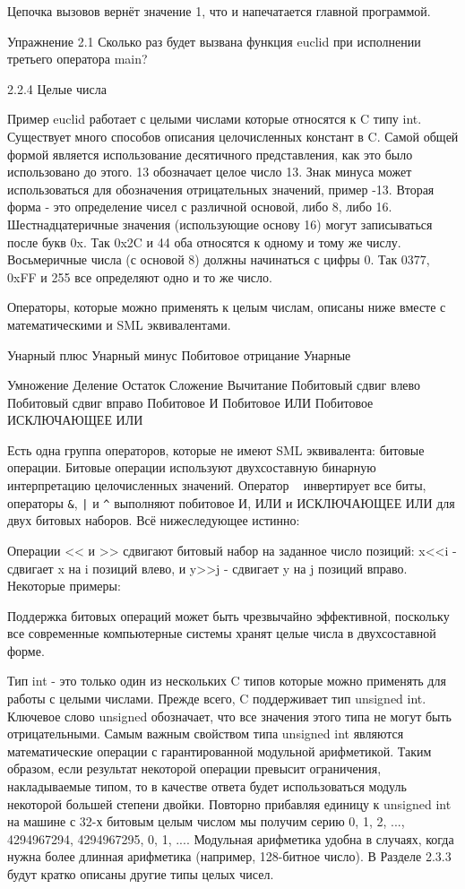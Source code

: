 Цепочка вызовов вернёт значение 1, что и напечатается главной программой.

Упражнение 2.1 Сколько раз будет вызвана функция euclid при исполнении третьего оператора main?

2.2.4 Целые числа

Пример euclid работает с целыми числами которые относятся к C типу int. Существует много способов описания целочисленных констант в C. Самой общей формой является использование десятичного представления, как это было использовано до этого. 13 обозначает целое число 13. Знак минуса может использоваться для обозначения отрицательных значений, пример -13. Вторая форма - это определение чисел с различной основой, либо 8, либо 16. Шестнадцатеричные значения (использующие основу 16) могут записываться после букв 0x. Так 0x2C и 44 оба относятся к одному и тому же числу. Восьмеричные числа (с основой 8) должны начинаться с цифры 0. Так 0377, 0xFF и 255 все определяют одно и то же число.

Операторы, которые можно применять к целым числам, описаны ниже вместе с математическими и SML эквивалентами.

Унарный плюс
Унарный минус
Побитовое отрицание
Унарные

Умножение
Деление
Остаток
Сложение
Вычитание
Побитовый сдвиг влево
Побитовый сдвиг вправо
Побитовое И
Побитовое ИЛИ
Побитовое ИСКЛЮЧАЮЩЕЕ ИЛИ

Есть одна группа операторов, которые не имеют SML эквивалента: битовые операции. Битовые операции используют двухсоставную бинарную интерпретацию целочисленных значений. Оператор ~ инвертирует все биты, операторы \lstinline|&|, \lstinline!|! и \lstinline|^| выполняют побитовое И, ИЛИ и ИСКЛЮЧАЮЩЕЕ ИЛИ для двух битовых наборов. Всё нижеследующее истинно:

Операции << и >> сдвигают битовый набор на заданное число позиций: x<<i - сдвигает x на i позиций влево, и y>>j - сдвигает y на j позиций вправо. Некоторые примеры:

Поддержка битовых операций может быть чрезвычайно эффективной, поскольку все современные компьютерные системы хранят целые числа в двухсоставной форме.

Тип int - это только один из нескольких C типов которые можно применять для работы с целыми числами. Прежде всего, C поддерживает тип unsigned int. Ключевое слово unsigned обозначает, что все значения этого типа не могут быть отрицательными. Самым важным свойством типа unsigned int являются математические операции с гарантированной модульной арифметикой. Таким образом, если результат некоторой операции превысит ограничения, накладываемые типом, то в качестве ответа будет использоваться модуль некоторой большей степени двойки. Повторно прибавляя единицу к unsigned int на машине с 32-х битовым целым числом мы получим серию 0, 1, 2, ..., 4294967294, 4294967295, 0, 1, .... Модульная арифметика удобна в случаях, когда нужна более длинная арифметика (например, 128-битное число). В Разделе 2.3.3 будут кратко описаны другие типы целых чисел.

